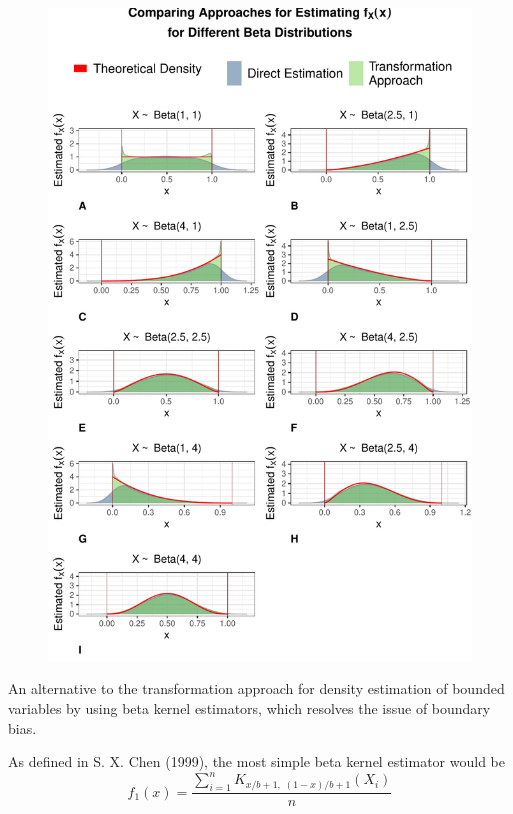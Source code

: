 \documentclass[12pt,twoside]{smiththesis}
\begin{document}
\begin{figure}

{\centering \includegraphics[width=1\linewidth]{thesis_files/figure-latex/unnamed-chunk-43-1} 

}

\caption{\label{fig:compare-beta-params}}\label{fig:unnamed-chunk-43}
\end{figure}
An alternative to the transformation approach for density estimation of bounded variables by using beta kernel estimators, which resolves the issue of boundary bias.

As defined in S. X. Chen (1999), the most simple beta kernel estimator would be
\[\hat f_1(x) = \dfrac{\sum_{i=1}^n K_{x/b + 1, \; (1-x)/b + 1} (X_i)}{n}\]
\end{document}
